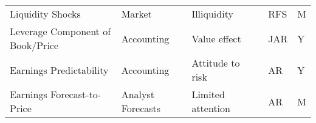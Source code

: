 \begin{tabular}{llllll}
Liquidity Shocks                           &             Market &            Illiquidity &           \cite{bali2013liquidity} &     RFS &         M \\
Leverage Component of Book/Price           &         Accounting &           Value effect &              \cite{penman2007book} &     JAR &         Y \\
Earnings Predictability                    &         Accounting &       Attitude to risk &            \cite{francis2004costs} &      AR &         Y \\
Earnings Forecast-to-Price                 &  Analyst Forecasts &      Limited attention &           \cite{elgers2001delayed} &      AR &         M \\
\bottomrule
\end{tabular}
